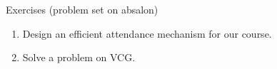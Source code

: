 \documentclass[english,10pt
,aspectratio=169
]{beamer}
\begin{document}
\begin{frame}{Exercises}
	(problem set on absalon)
	\begin{enumerate}
		\item Design an efficient attendance mechanism for our course.
		\item Solve a problem on VCG.
	\end{enumerate}
\end{frame}



%
%
%
%
\end{document}
